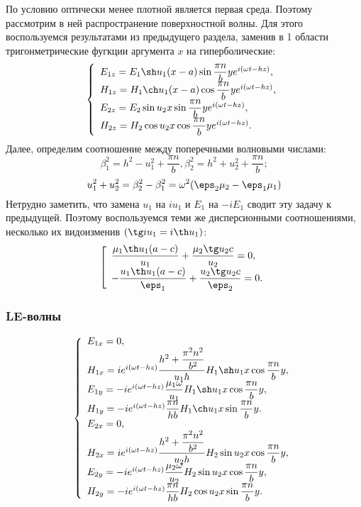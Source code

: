По условию оптически менее плотной является первая среда. Поэтому рассмотрим
в ней распространение поверхностной волны. Для этого воспользуемся результатами
из предыдущего раздела, заменив в 1 области тригонметрические фугкции аргумента
\(x\) на гиперболические:
\[
    \left\{
    \begin{array}{l}
        E_{1z} = E_1\sh u_1 (x-a) \sin \frac{\pi n}{b}y
        e^{i(\omega t - h z)},\\
        H_{1z} = H_1\ch u_1 (x-a) \cos \frac{\pi n}{b}y
        e^{i(\omega t - h z)},\\
        E_{2z} = E_2\sin u_2 x \sin \frac{\pi n}{b}y
        e^{i(\omega t - h z)},\\
        H_{2z} = H_2\cos u_2 x \cos \frac{\pi n}{b}y
        e^{i(\omega t - h z)}.
    \end{array}
    \right.
\]
Далее, определим соотношение между поперечными волновыми числами:
\[
    \beta_1^2 = h^2 - u_1^2 + \frac{\pi n}{b},
    \beta_2^2 = h^2 + u_2^2 + \frac{\pi n}{b};
\]
\[
    u_1^2 + u_2^2 = \beta_2^2 - \beta_1^2 = \omega^2(\eps_2\mu_2 - \eps_1\mu_1)
\]
Нетрудно заметить, что замена \( u_1 \) на \( iu_1 \) и \( E_1 \) на \( -iE_1 \)
сводит эту задачу к предыдущей. Поэтому воспользуемся теми же дисперсионными
соотношениями, несколько их видоизменив \((\tg iu_1 = i\th u_1)\):
\[
    \left[
        \begin{array}{ll}
            \frac{\mu_1\th u_1 (a-c)}{u_1} + \frac{\mu_2\tg u_2 c}{u_2} = 0,\\
            -\frac{u_1\th u_1 (a-c)}{\eps_1} + \frac{u_2\tg u_2 c}{\eps_2} = 0.
        \end{array}
    \right.
\]

\subsubsection{LE-волны}
\[
    \left\{
    \begin{array}{l}
        E_{1x} = 0,\\
        H_{1x} = i e^{i(\omega t - h z)}\frac{h^2 + \frac{\pi^2 n^2}{b^2}}
            {u_1h}H_1 \sh u_1 x \cos \frac{\pi n}{b}y,\\
        E_{1y} = -i e^{i(\omega t - h z)}\frac{\mu_1\omega}{u_1} H_1
            \sh u_1 x \cos \frac{\pi n}{b}y,\\
        H_{1y} = -i e^{i(\omega t - h z)}\frac{\pi n}{hb}H_1
            \ch u_1 x \sin \frac{\pi n}{b}y.\\
        E_{2x} = 0,\\
        H_{2x} = i e^{i(\omega t - h z)}\frac{h^2 + \frac{\pi^2 n^2}{b^2}}
            {u_2h}H_2 \sin u_2 x \cos \frac{\pi n}{b}y,\\
        E_{2y} = -i e^{i(\omega t - h z)}\frac{\mu_2\omega}{u_2} H_2
            \sin u_2 x \cos \frac{\pi n}{b}y,\\
        H_{2y} = -i e^{i(\omega t - h z)}\frac{\pi n}{hb}H_2
            \cos u_2 x \sin \frac{\pi n}{b}y.\\
    \end{array}
    \right.
\]

